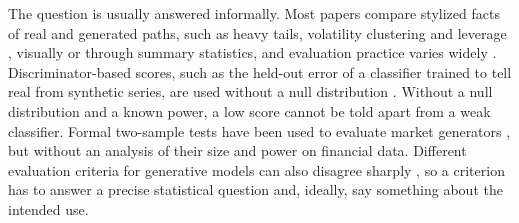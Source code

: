 The question is usually answered informally. Most papers compare stylized facts of real and
generated paths, such as heavy tails, volatility clustering and leverage
\citep{cont2001empirical}, visually or through summary statistics, and evaluation practice varies
widely \citep{stenger2024evaluation}. Discriminator-based scores, such as the held-out error of a
classifier trained to tell real from synthetic series, are used without a null distribution
\citep{yoon2019time,francopedroso2018ets,storchan2021learning}. Without a null distribution and a
known power, a low score cannot be told apart from a weak classifier. Formal two-sample tests have
been used
to evaluate market generators \citep{buehler2020data,chevyrev2022signature}, but without an
analysis of their size and power on financial data. Different evaluation criteria for generative
models can also disagree sharply \citep{theis2016note}, so a criterion has to answer a precise
statistical question and, ideally, say something about the intended use.

